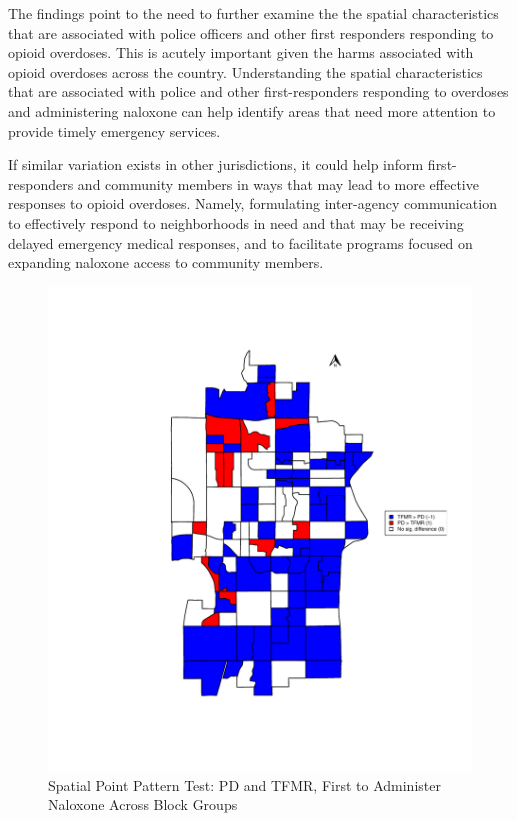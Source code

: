The findings point to the need to further examine the the spatial characteristics that are associated with police officers and other first responders responding to opioid overdoses. This is acutely important given the harms associated with opioid overdoses across the country. Understanding the spatial characteristics that are associated with police and other first-responders responding to overdoses and administering naloxone can help identify areas that need more attention to provide timely emergency services.

If similar variation exists in other jurisdictions, it could help inform first-responders and community members in ways that may lead to more effective responses to opioid overdoses. Namely, formulating inter-agency communication to effectively respond to neighborhoods in need and that may be receiving delayed emergency medical responses, and to facilitate programs focused on expanding naloxone access to community members. 

\newpage





\begin{figure}
    \caption{Spatial Point Pattern Test: PD and TFMR, First to Administer Naloxone Across Block Groups}
    \centering
    \includegraphics{figures/sppt-naloxone.pdf}
\end{figure}

